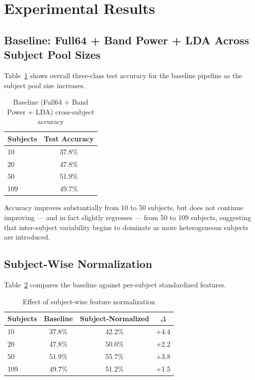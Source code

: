 \documentclass[11pt,a4paper]{article}
\begin{document}
\section{Experimental Results}

\subsection{Baseline: Full64 + Band Power + LDA Across Subject Pool Sizes}
Table~\ref{tab:baseline-results} shows overall three-class test accuracy for the baseline pipeline as the subject pool size increases.

\begin{table}[h!]
\centering
\caption{Baseline (Full64 + Band Power + LDA) cross-subject accuracy}
\label{tab:baseline-results}
\begin{tabular}{lc}
\toprule
\textbf{Subjects} & \textbf{Test Accuracy} \\
\midrule
10  & 37.8\% \\
20  & 47.8\% \\
50  & 51.9\% \\
109 & 49.7\% \\
\bottomrule
\end{tabular}
\end{table}

Accuracy improves substantially from 10 to 50 subjects, but does not continue improving --- and in fact slightly regresses --- from 50 to 109 subjects, suggesting that inter-subject variability begins to dominate as more heterogeneous subjects are introduced.

\subsection{Subject-Wise Normalization}
Table~\ref{tab:norm-results} compares the baseline against per-subject standardized features.

\begin{table}[h!]
\centering
\caption{Effect of subject-wise feature normalization}
\label{tab:norm-results}
\begin{tabular}{lccc}
\toprule
\textbf{Subjects} & \textbf{Baseline} & \textbf{Subject-Normalized} & \textbf{$\Delta$} \\
\midrule
10  & 37.8\% & 42.2\% & +4.4 \\
20  & 47.8\% & 50.0\% & +2.2 \\
50  & 51.9\% & 55.7\% & +3.8 \\
109 & 49.7\% & 51.2\% & +1.5 \\
\bottomrule
\end{tabular}
\end{table}
\end{document}
